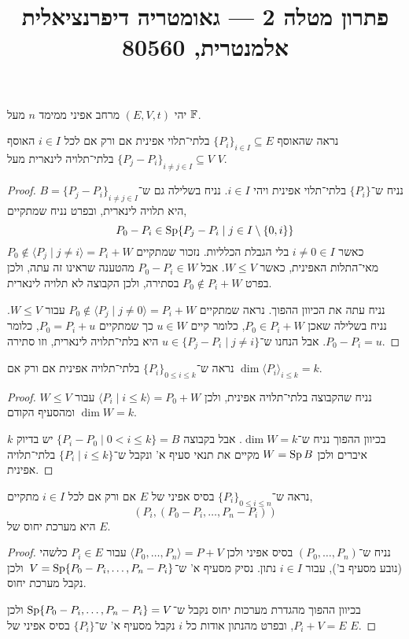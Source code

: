 
\title{פתרון מטלה 2 --- גאומטריה דיפרנציאלית אלמנטרית, 80560}


\maketitle
\maketitleprint[purple]

\question{}
יהי $(E, V, t)$ מרחב אפיני ממימד $n$ מעל $\mathbb{F}$.

\subquestion{}
נראה שהאוסף ${\{ P_i \}}_{i \in I} \subseteq E$ בלתי־תלוי אפינית אם ורק אם לכל $i \in I$ האוסף ${\{ P_j - P_i \}}_{i \ne j \in I} \subseteq V$ בלתי־תלויה לינארית מעל $V$.
\begin{proof}
	נניח ש־$\{ P_i \}$ בלתי־תלוי אפינית ויהי $i \in I$.
	נניח בשלילה גם ש־$B = {\{ P_j - P_i \}}_{i \ne j \in I}$ היא תלויה לינארית, ובפרט נניח שמתקיים,
	\[
		P_0 - P_i
		\in \operatorname{Sp}\{ P_j - P_i \mid j \in I \setminus \{0, i\} \}
	\]
	כאשר $i \ne 0 \in I$ בלי הגבלת הכלליות.
	נזכור שמתקיים $P_0 \notin \langle P_j \mid j \ne i \rangle = P_i + W$ מאי־התלות האפינית, כאשר $W \le V$.
	אבל $P_0 - P_i \in W$ מהטענה שראינו זה עתה, ולכן בפרט $P_0 \notin P_i + W$ בסתירה, ולכן הקבוצה לא תלויה לינארית.

	נניח עתה את הכיוון ההפוך.
	נראה שמתקיים $P_0 \notin \langle P_j \mid j \ne 0 \rangle = P_i + W$ עבור $W \le V$.
	נניח בשלילה שאכן $P_0 \in P_i + W$, כלומר קיים $u \in W$ כך שמתקיים $P_0 = P_i + u$, כלומר $P_0 - P_i = u$.
	אבל הנחנו ש־$u \in \{ P_j - P_i \mid j \ne i \}$ היא בלתי־תלויה לינארית, וזו סתירה.
\end{proof}

\subquestion{}
נראה ש־${\{ P_i \}}_{0 \le i \le k}$ בלתי־תלויה אפינית אם ורק אם $\dim{\langle P_i \rangle}_{i \le k} = k$.
\begin{proof}
	נניח שהקבוצה בלתי־תלויה אפינית, ולכן $\langle P_i \mid i \le k \rangle = P_0 + W$ עבור $W \le V$ ומהסעיף הקודם $\dim W = k$.

	בכיוון ההפוך נניח ש־$\dim W = k$.
	אבל בקבוצה $\{ P_i - P_0 \mid 0 < i \le k \} = B$ יש בדיוק $k$ איברים ולכן $W = \operatorname{Sp} B$ מקיים את תנאי סעיף א' ונקבל ש־$\{ P_i \mid i \le k \}$ בלתי־תלויה אפינית.
\end{proof}

\subquestion{}
נראה ש־${\{ P_i \}}_{0 \le i \le n}$ בסיס אפיני של $E$ אם ורק אם לכל $i \in I$ מתקיים,
\[
	(P_i, (P_0 - P_i, \ldots, P_n - P_i))
\]
היא מערכת יחוס של $E$.
\begin{proof}
	נניח ש־$(P_0, \ldots, P_n)$ בסיס אפיני ולכן $\langle P_0, \ldots, P_n \rangle = P + V$ עבור $P_i \in E$ כלשהי (נובע מסעיף ב'), עבור $i \in I$ נתון.
	נסיק מסעיף א' ש־$V = \operatorname{Sp}\{ P_0 - P_i, \ldots, P_n - P_i \}$\ ולכן נקבל מערכת יחוס.

	בכיוון ההפוך מהגדרת מערכות יחוס נקבל ש־$\operatorname{Sp}\{ P_0 - P_i, \ldots, P_n - P_i \} = V$ ולכן $P_i + V = E$, ובפרט מהנתון אודות כל $i$ נקבל מסעיף א' ש־$\{ P_i \}$ בסיס אפיני של $E$.
\end{proof}

